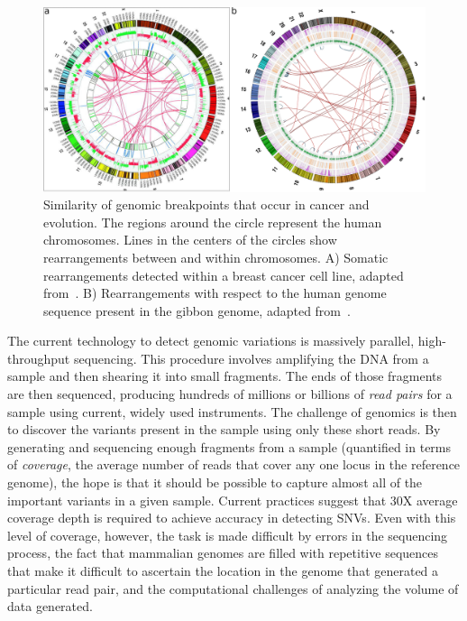 \begin{figure}
\centering
\includegraphics[width=.9\textwidth]{figures/breakpoints_in_cancer_and_evolution.pdf}
\caption[Similarity of genomic breakpoints that occur in cancer and evolution.]{Similarity of genomic breakpoints that occur in cancer and evolution. The regions around the circle represent the human chromosomes. Lines in the centers of the circles show rearrangements between and within chromosomes. A) Somatic rearrangements detected within a breast cancer cell line, adapted from~\cite{Hampton:2009fc}. B) Rearrangements with respect to the human genome sequence present in the gibbon genome, adapted from~\cite{Carbone:2009p1012}.}
\label{cancer_evolution_breakpoints}
\end{figure}

The current technology to detect genomic variations is massively parallel, high-throughput sequencing. This procedure involves amplifying the DNA from a sample and then shearing it into small fragments. The ends of those fragments are then sequenced, producing hundreds of millions or billions of \emph{read pairs} for a sample using current, widely used instruments. The challenge of genomics is then to discover the variants present in the sample using only these short reads. By generating and sequencing enough fragments from a sample (quantified in terms of \emph{coverage}, the average number of reads that cover any one locus in the reference genome), the hope is that it should be possible to capture almost all of the important variants in a given sample. Current practices suggest that 30X average coverage depth is required to achieve accuracy in detecting SNVs. Even with this level of coverage, however, the task is made difficult by errors in the sequencing process, the fact that mammalian genomes are filled with repetitive sequences that make it difficult to ascertain the location in the genome that generated a particular read pair, and the computational challenges of analyzing the volume of data generated.

